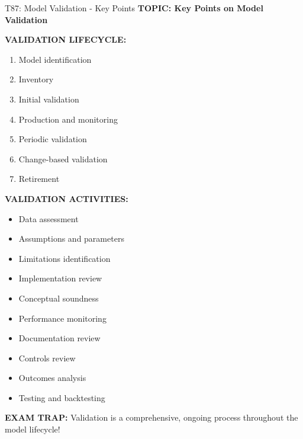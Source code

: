 \documentclass[8pt]{beamer}
\begin{document}
	\begin{frame}{T87: Model Validation - Key Points}
		\fontsize{6.5}{7.5}\selectfont
		\textbf{TOPIC: Key Points on Model Validation}
		
		\vspace{0.1cm}
		\textbf{VALIDATION LIFECYCLE:}
		\begin{enumerate}
			\item Model identification
			\item Inventory
			\item Initial validation
			\item Production and monitoring
			\item Periodic validation
			\item Change-based validation
			\item Retirement
		\end{enumerate}
		
		\vspace{0.1cm}
		\textbf{VALIDATION ACTIVITIES:}
		\begin{itemize}
			\item Data assessment
			\item Assumptions and parameters
			\item Limitations identification
			\item Implementation review
			\item Conceptual soundness
			\item Performance monitoring
			\item Documentation review
			\item Controls review
			\item Outcomes analysis
			\item Testing and backtesting
		\end{itemize}
		
		\textcolor{myred}{\textbf{EXAM TRAP:}} Validation is a \textcolor{myblue}{comprehensive, ongoing process throughout the model lifecycle}!
	\end{frame}
	
\end{document}
